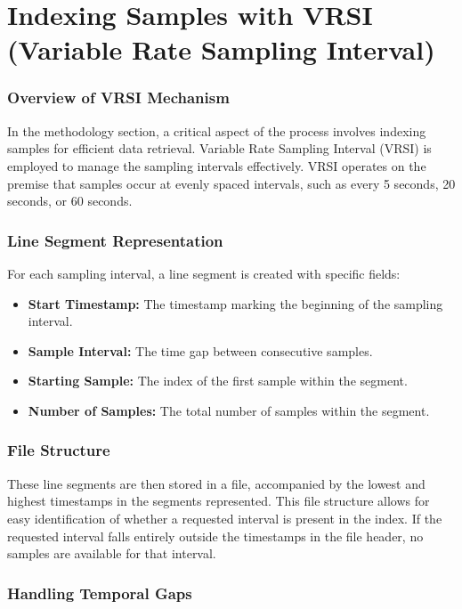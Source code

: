 \documentclass[conference]{IEEEtran}
\begin{document}
\section{Indexing Samples with VRSI (Variable Rate Sampling Interval)}
\subsubsection{Overview of VRSI Mechanism}

In the methodology section, a critical aspect of the process involves indexing samples for efficient data retrieval. Variable Rate Sampling Interval (VRSI) is employed to manage the sampling intervals effectively. VRSI operates on the premise that samples occur at evenly spaced intervals, such as every 5 seconds, 20 seconds, or 60 seconds.
\vspace{5pt}
\subsubsection{Line Segment Representation}

For each sampling interval, a line segment is created with specific fields:

\begin{itemize}
    \item \textbf{Start Timestamp:} The timestamp marking the beginning of the sampling interval.
    \item \textbf{Sample Interval:} The time gap between consecutive samples.
    \item \textbf{Starting Sample:} The index of the first sample within the segment.
    \item \textbf{Number of Samples:} The total number of samples within the segment.
\end{itemize}
\vspace{5pt}
\subsubsection{File Structure}

These line segments are then stored in a file, accompanied by the lowest and highest timestamps in the segments represented. This file structure allows for easy identification of whether a requested interval is present in the index. If the requested interval falls entirely outside the timestamps in the file header, no samples are available for that interval.
\vspace{5pt}
\subsubsection{Handling Temporal Gaps}
\end{document}
